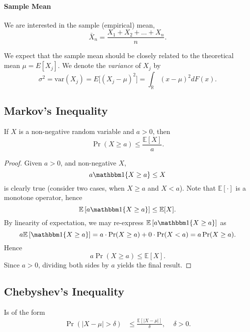 \documentclass[12pt]{article}  \usepackage{algorithm2e} \usepackage{amsmath} \usepackage{amsthm} \usepackage{amsfonts} \usepackage{bbm} \usepackage{color,soul} \usepackage{framed} \usepackage[margin=0.5in]{geometry} \usepackage{hyperref} \usepackage{mathtools} \usepackage[dvipsnames]{xcolor}
\begin{document}
\paragraph{Sample Mean} We are interested in the sample (empirical) mean,
\[
\bar{X}_n = \frac{X_1 + X_2 + \ldots + X_n}{n}.
\]

We expect that the sample mean should be closely related to the theoretical mean $\mu = E[X_j]$. We denote the \emph{variance} of $X_j$ by
\[
\sigma^2 = \textrm{var}(X_j) = E\big[ (X_j - \mu)^2 \big] = \int_{\mathbb R} (x-\mu)^2 d F(x).
\]

\subsection{Markov's Inequality} If $X$ is a non-negative random variable
and $a > 0$, then
\[
\Pr(X \geq a) \leq \frac{\mathbb E[X]}{a}.
\]

\begin{proof}   Given $a > 0$, and non-negative $X$,
  \[
    a \mathbbm 1\{X \geq a\} \leq X
  \]
  is clearly true (consider two cases, when $X \geq a$ and $X < a$).
  Note that $\mathbb E[\cdot]$ is a monotone operator, hence
  \[
    \mathbb E\left[ a \mathbbm 1\{X \geq a\} \right] \leq \mathbb E[X].
  \]
  By linearity of expectation, we may re-express $\mathbb E\left[ a \mathbbm 1\{X \geq a\} \right]$ as
  \[
    a \mathbb E\left[ \mathbbm 1\{X \geq a\} \right] = a \cdot \Pr(X \geq a) + 0 \cdot \Pr(X < a) = a \Pr(X \geq a). 
  \]
  Hence
  \[
    a \Pr(X \geq a) \leq \mathbb E[X].
  \]
  Since $a > 0$, dividing both sides by $a$ yields the final result. \end{proof}

\subsection{Chebyshev's Inequality} Is of the form
\begin{align*}
\Pr(|X-\mu| > \delta) &\leq \frac{\mathbb E \left[ |X - \mu| \right]}{\delta}, \, \, &\delta > 0.
\end{align*}
\end{document}

